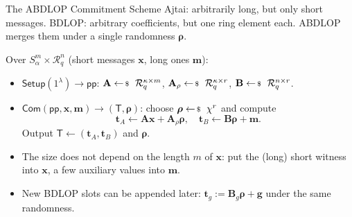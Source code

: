 \documentclass{zkdl-presentation-template}
\begin{document}
    \begin{frame}{The ABDLOP Commitment Scheme}
        Ajtai: arbitrarily long, but only short messages. BDLOP: arbitrary coefficients, but one ring element each. ABDLOP merges them under a single randomness $\boldsymbol{\rho}$.
        \begin{definition}
            Over $S_{\alpha}^m \times \mathcal{R}_q^n$ (short messages $\mathbf{x}$, long ones $\mathbf{m}$):
            \begin{itemize}
                \item $\mathsf{Setup}(1^{\lambda}) \to \mathsf{pp}$: $\mathbf{A} \leftarrowS \mathcal{R}_q^{\kappa \times m}$, $\mathbf{A}_{\rho} \leftarrowS \mathcal{R}_q^{\kappa \times r}$, $\mathbf{B} \leftarrowS \mathcal{R}_q^{n \times r}$.
                \item $\mathsf{Com}(\mathsf{pp}, \mathbf{x}, \mathbf{m}) \to (\mathsf{T}, \boldsymbol{\rho})$: choose $\boldsymbol{\rho} \leftarrowS \chi^r$ and compute
                \begin{equation*}
                    \mathbf{t}_A \gets \mathbf{A}\mathbf{x} + \mathbf{A}_{\rho}\boldsymbol{\rho}, \quad \mathbf{t}_B \gets \mathbf{B}\boldsymbol{\rho} + \mathbf{m}.
                \end{equation*}
                Output $\mathsf{T} \gets (\mathbf{t}_A, \mathbf{t}_B)$ and $\boldsymbol{\rho}$.
            \end{itemize}
        \end{definition}
        \pause

        \begin{itemize}
            \item The size does not depend on the length $m$ of $\mathbf{x}$: put the (long) short witness into $\mathbf{x}$, a few auxiliary values into $\mathbf{m}$.\pause
            \item New BDLOP slots can be appended later: $\mathbf{t}_g := \mathbf{B}_g\boldsymbol{\rho} + \mathbf{g}$ under the same randomness.
        \end{itemize}
    \end{frame}
\end{document}
